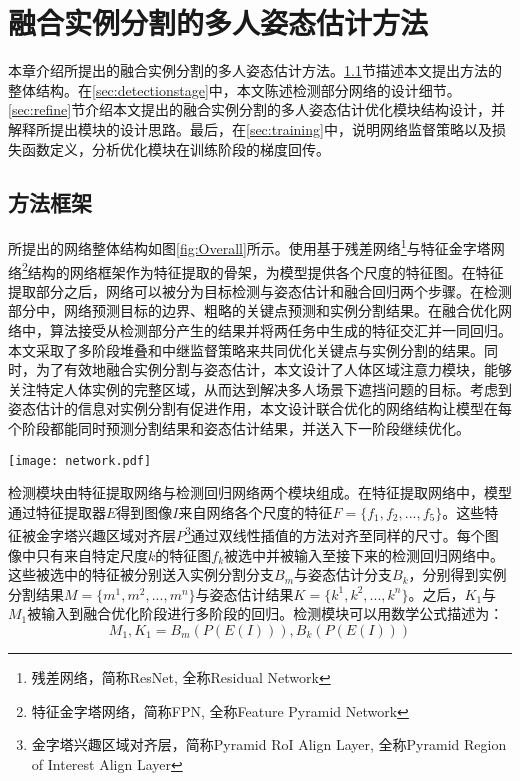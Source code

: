 \chapter{融合实例分割的多人姿态估计方法}
\label{cha:method}
本章介绍所提出的融合实例分割的多人姿态估计方法。\ref{sec:methodoverview}节描述本文提出方法的整体结构。在\ref{sec:detectionstage}中，本文陈述检测部分网络的设计细节。\ref{sec:refine}节介绍本文提出的融合实例分割的多人姿态估计优化模块结构设计，并解释所提出模块的设计思路。最后，在\ref{sec:training}中，说明网络监督策略以及损失函数定义，分析优化模块在训练阶段的梯度回传。

\section{方法框架}
\label{sec:methodoverview}
所提出的网络整体结构如图\ref{fig:Overall}所示。使用基于残差网络\footnote{残差网络，简称ResNet, 全称Residual Network}与特征金字塔网络\footnote{特征金字塔网络，简称FPN, 全称Feature Pyramid Network}结构的网络框架作为特征提取的骨架，为模型提供各个尺度的特征图。在特征提取部分之后，网络可以被分为目标检测与姿态估计和融合回归两个步骤。在检测部分中，网络预测目标的边界、粗略的关键点预测和实例分割结果。在融合优化网络中，算法接受从检测部分产生的结果并将两任务中生成的特征交汇并一同回归。本文采取了多阶段堆叠和中继监督策略来共同优化关键点与实例分割的结果。同时，为了有效地融合实例分割与姿态估计，本文设计了人体区域注意力模块，能够关注特定人体实例的完整区域，从而达到解决多人场景下遮挡问题的目标。考虑到姿态估计的信息对实例分割有促进作用，本文设计联合优化的网络结构让模型在每个阶段都能同时预测分割结果和姿态估计结果，并送入下一阶段继续优化。

\begin{figure*}[htbp]	
	\centering
	\texttt{[image: network.pdf]}
	\caption{网络整体结构}
	\label{fig:Overall}
\end{figure*}

检测模块由特征提取网络与检测回归网络两个模块组成。在特征提取网络中，模型通过特征提取器$E$得到图像$I$来自网络各个尺度的特征$F=\{f_1, f_2, ..., f_5\}$。这些特征被金字塔兴趣区域对齐层$P$\footnote{金字塔兴趣区域对齐层，简称Pyramid RoI Align Layer, 全称Pyramid Region of Interest Align Layer}通过双线性插值的方法对齐至同样的尺寸。每个图像中只有来自特定尺度$k$的特征图$f_k$被选中并被输入至接下来的检测回归网络中。这些被选中的特征被分别送入实例分割分支$B_m$与姿态估计分支$B_k$，分别得到实例分割结果$M=\{m^1, m^2, ..., m^n\}$与姿态估计结果$K=\{k^1, k^2, ..., k^n\}$。之后，$K_1$与$M_1$被输入到融合优化阶段进行多阶段的回归。检测模块可以用数学公式描述为：
\begin{equation}
\label{def:detectnet}
M_1, K_1 = B_m(P(E(I))), B_k(P(E(I)))
\end{equation}

